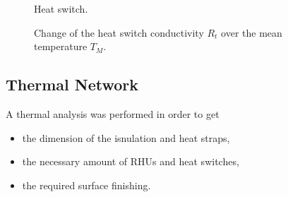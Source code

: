 \begin{figure}[h]
	\centering
	\qquad\qquad
	\caption{Heat switch.}
	\label{fig:tcs_switch01}
\end{figure}

\begin{figure}[h]
	\centering
	\qquad
	\caption{Change of the heat switch conductivity $R_t$ over the mean temperature $T_M$.}
	\label{fig:tcs_switch02}
\end{figure}

\subsection{Thermal Network}
A thermal analysis was performed in order to get
\begin{itemize}
	\item the dimension of the isnulation and heat straps,
	\item the necessary amount of RHUs and heat switches,
	\item the required surface finishing.
\end{itemize}

